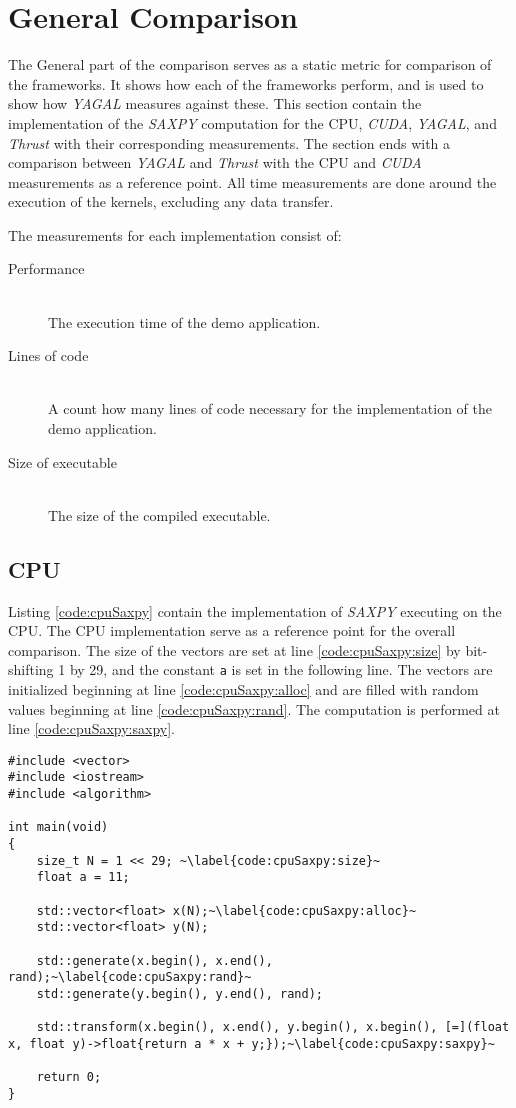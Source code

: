 \section{General Comparison}
The General part of the comparison serves as a static metric for comparison of the frameworks. It shows how each of the frameworks perform, and is used to show how \textit{YAGAL} measures against these. This section contain the implementation of the \textit{SAXPY} computation for the CPU, \textit{CUDA}, \textit{YAGAL}, and \textit{Thrust} with their corresponding measurements. The section ends with a comparison between \textit{YAGAL} and \textit{Thrust} with the CPU and \textit{CUDA} measurements as a reference point. All time measurements are done around the execution of the kernels, excluding any data transfer.

The measurements for each implementation consist of:
\begin{description}
\item[Performance]\hfill\\
The execution time of the demo application.
\item[Lines of code]\hfill\\
A count how many lines of code necessary for the implementation of the demo application.
\item[Size of executable]\hfill\\
The size of the compiled executable.
\end{description}

\subsection{CPU}
Listing \ref{code:cpuSaxpy} contain the implementation of \textit{SAXPY} executing on the CPU. The CPU implementation serve as a reference point for the overall comparison. The size of the vectors are set at line \ref{code:cpuSaxpy:size} by bit-shifting 1 by 29, and the constant \texttt{a} is set in the following line. The vectors are initialized beginning at line \ref{code:cpuSaxpy:alloc} and are filled with random values beginning at line \ref{code:cpuSaxpy:rand}. The computation is performed at line \ref{code:cpuSaxpy:saxpy}.

\begin{lstlisting}[caption={CPU \textit{SAXPY} implementation.}, label={code:cpuSaxpy}]
#include <vector>
#include <iostream>
#include <algorithm>

int main(void)
{
    size_t N = 1 << 29; ~\label{code:cpuSaxpy:size}~
    float a = 11;

    std::vector<float> x(N);~\label{code:cpuSaxpy:alloc}~
    std::vector<float> y(N);

    std::generate(x.begin(), x.end(), rand);~\label{code:cpuSaxpy:rand}~
    std::generate(y.begin(), y.end(), rand);

    std::transform(x.begin(), x.end(), y.begin(), x.begin(), [=](float x, float y)->float{return a * x + y;});~\label{code:cpuSaxpy:saxpy}~

    return 0;
}
\end{lstlisting}

